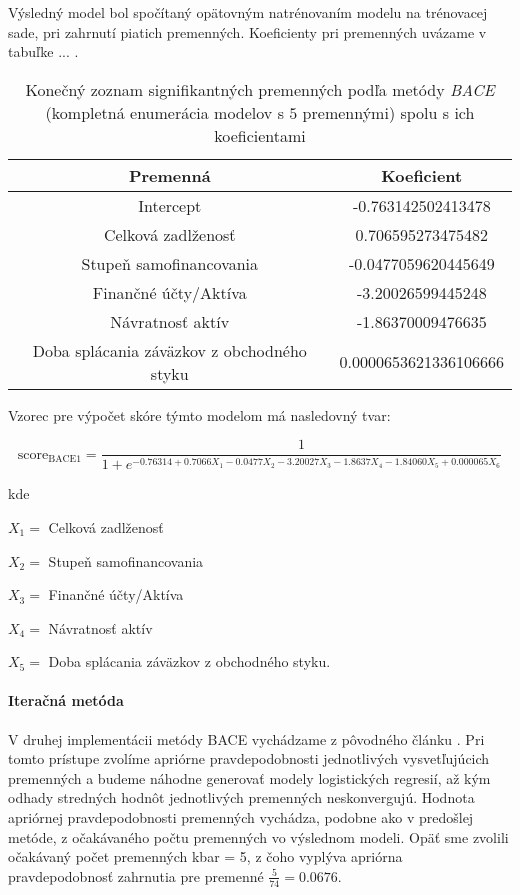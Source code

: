 Výsledný model bol spočítaný opätovným natrénovaním modelu na trénovacej sade, pri zahrnutí piatich premenných.
Koeficienty pri premenných uvázame v tabuľke ... .

\begin{table}
    \begin{tabular}{ |c|c| }
        \hline
        Premenná & Koeficient \\
        \hline
        Intercept & -0.763142502413478 \\
        \hline
        Celková zadlženosť & 0.706595273475482 \\
        \hline
        Stupeň samofinancovania & -0.0477059620445649 \\
        \hline
        Finančné účty/Aktíva & -3.20026599445248 \\
        \hline
        Návratnosť aktív & -1.86370009476635 \\
        \hline
        Doba splácania záväzkov z obchodného styku & 0.0000653621336106666 \\
        \hline
    \end{tabular}
    \caption{Konečný zoznam signifikantných premenných podľa metódy \emph{BACE} (kompletná enumerácia modelov s \(5\) premennými) spolu s ich koeficientami}
    \label{bace1 tabulka konecne parametre}
\end{table}

Vzorec pre výpočet skóre týmto modelom má nasledovný tvar:

\[
    \text{score}_\text{BACE1} = \frac{1}{1 + e^{-0.76314 + 0.7066X_1 - 0.0477X_2 - 3.20027X_3 - 1.8637X_4 - 1.84060X_5 + 0.000065X_6}}
\]

kde

\(X_1 = \) Celková zadlženosť

\(X_2 = \) Stupeň samofinancovania

\(X_3 = \) Finančné účty/Aktíva

\(X_4 = \) Návratnosť aktív

\(X_5 = \) Doba splácania záväzkov z obchodného styku.

\paragraph{Iteračná metóda}

V druhej implementácii metódy BACE vychádzame z pôvodného článku \cite{sala-i-martin}.
Pri tomto prístupe zvolíme apriórne pravdepodobnosti jednotlivých vysvetľujúcich premenných a budeme náhodne generovať modely logistických regresií,
až kým odhady stredných hodnôt jednotlivých premenných neskonvergujú.
Hodnota apriórnej pravdepodobnosti premenných vychádza, podobne ako v predošlej metóde, z očakávaného počtu premenných vo výslednom modeli.
Opäť sme zvolili očakávaný počet premenných kbar = 5, z čoho vyplýva apriórna pravdepodobnosť zahrnutia pre premenné \( \frac{5}{74} = 0.0676 \).

